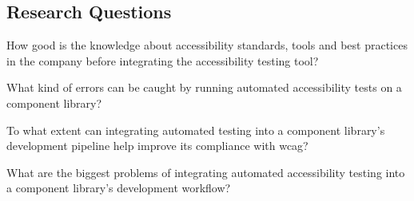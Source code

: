 \documentclass{master_thesis}
\begin{document}

\subsection{Research Questions}

	\begin{RQlist}
		\item How good is the knowledge about accessibility standards, tools and best practices in the company before integrating the accessibility testing tool?
		\item What kind of errors can be caught by running automated accessibility tests on a component library?
		\item To what extent can integrating automated testing into a component library's development pipeline help improve its compliance with \ac{wcag}?
		\item What are the biggest problems of integrating automated accessibility testing into a component library's development workflow?
	\end{RQlist}
\end{document}
